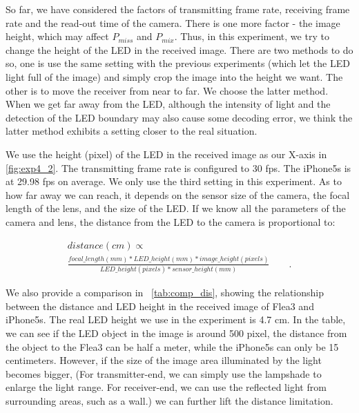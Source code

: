 So far, we have considered the factors of transmitting frame rate, receiving frame rate and the read-out time of the camera. There is one more factor - the image height, which may affect $P_{miss}$ and $P_{mix}$. Thus, in this experiment, we try to change the height of the LED in the received image.
There are two methods to do so, one is use the same setting with the previous experiments (which let the LED light full of the image) and simply crop the image into the height we want. The other is to move the receiver from near to far. We choose the latter method. When we get far away from the LED, although the intensity of light and the detection of the LED boundary may also cause some decoding error, we think the latter method exhibits a setting closer to the real situation. 

We use the height (pixel) of the LED in the received image as our X-axis in \autoref{fig:exp4_2}. The transmitting frame rate is configured to 30 fps. The iPhone5s is at 29.98 fps on average. We only use the third setting in this experiment. As to how far away we can reach, it depends on the sensor size of the camera, the focal length of the lens, and the size of the LED. 
If we know all the parameters of the camera and lens, the distance from the LED to the camera is proportional to:

\begin{multline}
	distance (cm) \propto \\
	\frac{focal\_length (mm) * LED\_height (mm) * image\_height (pixels)}{LED\_height (pixels) * sensor\_height (mm)} 
	\qquad \textrm{.}
\end{multline}

We also provide a comparison in ~\autoref{tab:comp_dis}, showing the relationship between the distance and LED height in the received image of Flea3 and iPhone5s. The real LED height we use in the experiment is 4.7 cm. In the table, we can see if the LED object in the image is around 500 pixel, the distance from the object to the Flea3 can be half a meter, while the iPhone5s can only be 15 centimeters. However, if the size of the image area illuminated by the light becomes bigger, (For transmitter-end, we can simply use the lampshade to enlarge the light range. For receiver-end, we can use the reflected light from surrounding areas, such as a wall.) we can further lift the distance limitation. 


